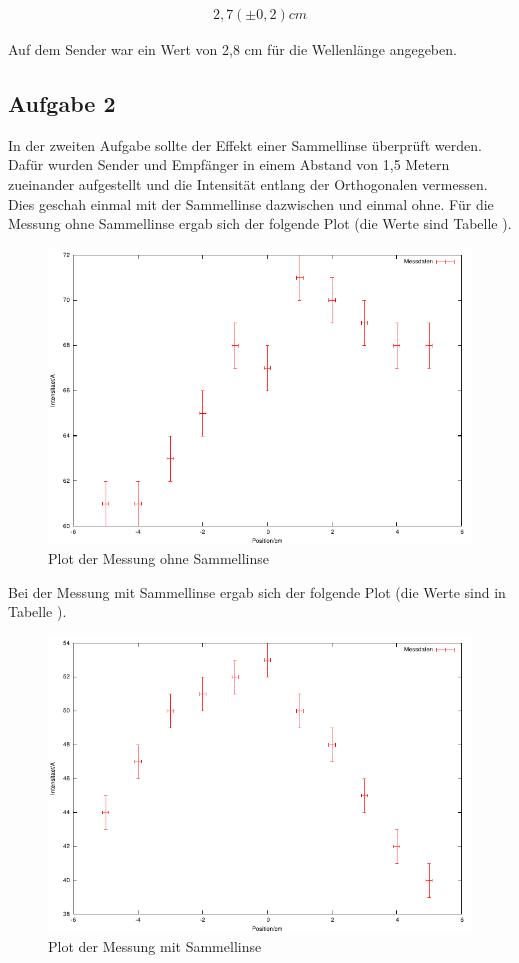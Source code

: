 \documentclass[12pt]{scrartcl}
\begin{document}
\begin{align*}
2,7 (\pm 0,2) cm
\end{align*}


Auf dem Sender war ein Wert von 2,8 cm für die Wellenlänge angegeben.

\subsection{Aufgabe 2}
In der zweiten Aufgabe sollte der Effekt einer Sammellinse überprüft werden.
Dafür wurden Sender und Empfänger in einem Abstand von 1,5 Metern zueinander aufgestellt und die Intensität entlang der Orthogonalen vermessen. Dies geschah einmal mit der Sammellinse dazwischen und einmal ohne. Für die Messung ohne Sammellinse ergab sich der folgende Plot (die Werte sind Tabelle %
).

\begin{figure}[H]
\centering
    \includegraphics[scale = 1]{a_2_o.pdf}
  	\caption[Plot der Messung ohne Sammellinse]{Plot der Messung ohne Sammellinse}
  \label{fig:a_2_o}
\end{figure}

Bei der Messung mit Sammellinse ergab sich der folgende Plot (die Werte sind in Tabelle 
).


\begin{figure}[H]
\centering
    \includegraphics[scale = 1]{a_2_m.pdf}
  	\caption[Plot der Messung mit Sammellinse]{Plot der Messung mit Sammellinse}
  \label{fig:a_2_m}
\end{figure}
\end{document}
